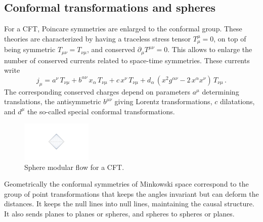 \documentclass[12pt]{article}
\numberwithin{equation}{section}
\newcommand{\be}{\begin{equation}}
\newcommand{\ee}{\end{equation}}
\begin{document}
\subsection{Conformal transformations and spheres}
For a CFT, Poincare symmetries are enlarged to the conformal group. These theories are characterized by having a traceless stress tensor $T_\mu^\mu=0$, on top of being symmetric $T_{\mu\nu}=T_{\nu\mu}$, and conserved  $\partial_\mu T^{\mu\nu}=0$. This allows to enlarge the number of conserved currents related to space-time symmetries. These currents write
\be  
j_\mu= a^\nu \,T_{\nu\mu} +  b^{\alpha \nu}\,x_\alpha\, T_{\nu\mu} + c\, x^\nu\, T_{\nu\mu} + d_\alpha\, (x^2 g^{\alpha\nu}-2\, x^\alpha x^\nu)\, T_{\nu\mu}\,.\label{das} 
\ee
The corresponding conserved charges depend on parameters $a^\mu$ determining translations, the antisymmetric $b^{\mu\nu}$ giving Lorentz transformations, $c$ dilatations, and $d^\mu$ the so-called special conformal transformations.   

\begin{figure}[t]
\begin{center}  
\includegraphics[width=0.30\textwidth]{flowsphere.pdf}
\captionsetup{width=0.9\textwidth}
\caption{Sphere modular flow for a CFT.}
\label{smf}
\end{center}  
\end{figure}

Geometrically the conformal symmetries of Minkowski space correspond to the group of point transformations that keeps the angles invariant but can deform the distances. It keeps the null lines into null lines, maintaining the causal structure. It also sends planes to planes or spheres, and spheres to spheres or planes.  
\end{document}
